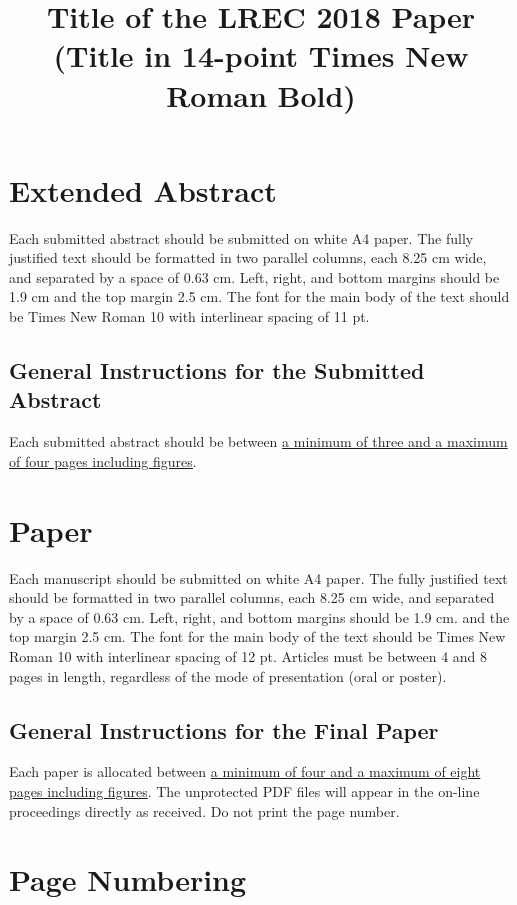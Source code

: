 \documentclass{lrec}
\title{Title of the LREC 2018 Paper (Title in 14-point Times New Roman Bold)}
\begin{document}
\maketitle

\section{Extended Abstract}

Each submitted abstract should be submitted on white A4 paper. The fully
justified text should be formatted in two parallel columns, each 8.25 cm wide,
and separated by a space of 0.63 cm. Left, right, and bottom margins should be
1.9 cm and the top margin 2.5 cm. The font for the main body of the text should
be Times New Roman 10 with interlinear spacing of 11 pt.

\subsection{General Instructions for the Submitted Abstract}

Each submitted abstract should be between \ul{a minimum of three and
a maximum of four pages including figures}.

\section{Paper}

Each manuscript should be submitted on white A4 paper. The fully
justified text should be formatted in two parallel columns, each 8.25 cm wide,
and separated by a space of 0.63 cm. Left, right, and bottom margins should be
1.9 cm. and the top margin 2.5 cm. The font for the main body of the text should
be Times New Roman 10 with interlinear spacing of 12 pt.  Articles must be
between 4 and 8 pages in length, regardless of the mode of presentation (oral
or poster).

\subsection{General Instructions for the Final Paper}

Each paper is allocated between \ul{a minimum of four and a maximum of
eight pages including figures}. The unprotected PDF files will appear in the
on-line proceedings directly as received. Do not print the page number.

\section{Page Numbering}
\end{document}
